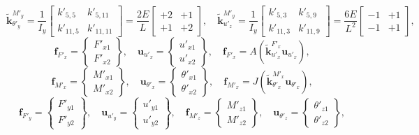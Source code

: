 \documentclass[12pt,a4paper,article]{memoir} %
\begin{document}
\begin{equation}
  \tilde{\mathbf{k}}_{\theta'_y}^{M'_y} = \frac{1}{I_y} \left[ \begin{array}{cc}
      k'_{5,5} & k'_{5,11} \\ k'_{11,5} & k'_{11,11} \end{array} \right] = \frac{2E}{L} \left[ \begin{array}{cc}
      +2 & +1 \\ +1 & +2 \end{array} \right], \quad
  \tilde{\mathbf{k}}_{u'_z}^{M'_y} = \frac{1}{I_y} \left[ \begin{array}{cc}
      k'_{5,3} & k'_{5,9} \\ k'_{11,3} & k'_{11,9} \end{array} \right] = \frac{6E}{L^2} \left[ \begin{array}{cc}
      -1 & +1 \\ -1 & +1 \end{array} \right],
\end{equation}
\begin{equation}
  \mathbf{f}_{F'_x} = \left\{ \begin{array}{c} F'_{x1} \\ F'_{x2} \end{array} \right\}, \quad 
  \mathbf{u}_{u'_x} = \left\{ \begin{array}{c} u'_{x1} \\ u'_{x2} \end{array} \right\}, \quad
  \mathbf{f}_{F'_x} = A \left( \tilde{\mathbf{k}}_{u'_x}^{F'_x} \mathbf{u}_{u'_x} \right),
\end{equation}
\begin{equation}
  \mathbf{f}_{M'_x} = \left\{ \begin{array}{c} M'_{x1} \\ M'_{x2} \end{array} \right\}, \quad 
  \mathbf{u}_{\theta'_x} = \left\{ \begin{array}{c} \theta'_{x1} \\ \theta'_{x2} \end{array} \right\}, \quad
  \mathbf{f}_{M'_x} = J \left( \tilde{\mathbf{k}}_{\theta'_x}^{M'_x} \mathbf{u}_{\theta'_x} \right),
\end{equation}
\begin{equation}
  \mathbf{f}_{F'_y} = \left\{ \begin{array}{c} F'_{y1} \\ F'_{y2} \end{array} \right\}, \quad 
  \mathbf{u}_{u'_y} = \left\{ \begin{array}{c} u'_{y1} \\ u'_{y2} \end{array} \right\}, \quad
  \mathbf{f}_{M'_z} = \left\{ \begin{array}{c} M'_{z1} \\ M'_{z2} \end{array} \right\}, \quad 
  \mathbf{u}_{\theta'_z} = \left\{ \begin{array}{c} \theta'_{z1} \\ \theta'_{z2} \end{array} \right\},
\end{equation}
\end{document}
